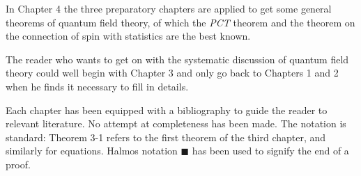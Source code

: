 In Chapter 4 the three preparatory chapters are applied to get some general theorems of quantum field theory, of which the \emph{PCT} theorem and the theorem on the connection of spin with statistics are the best known.

The reader who wants to get on with the systematic discussion of quantum field theory could well begin with Chapter 3 and only go back to Chapters 1 and 2 when he finds it necessary to fill in details.

Each chapter has been equipped with a bibliography to guide the reader to relevant literature. No attempt at completeness has been made. The notation is standard: Theorem 3-1 refers to the first theorem of the third chapter, and similarly for equations. Halmos notation \(\blacksquare\) has been used to signify the end of a proof.
